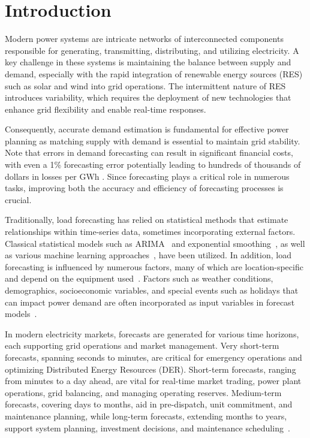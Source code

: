 \documentclass[sigconf,nonacm]{acmart}
\begin{document}

\maketitle

\section{Introduction}

Modern power systems are intricate networks of interconnected components responsible for generating, transmitting, distributing, and utilizing electricity. A key challenge in these systems is maintaining the balance between supply and demand, especially with the rapid integration of renewable energy sources (RES) such as solar and wind into grid operations. The intermittent nature of RES introduces variability, which requires the deployment of new technologies that enhance grid flexibility and enable real-time responses.

Consequently, accurate demand estimation is fundamental for effective power planning as matching supply with demand is essential to maintain grid stability. Note that errors in demand forecasting can result in significant financial costs, with even a 1\% forecasting error potentially leading to hundreds of thousands of dollars in losses per GWh \cite{Mansoor2024}. Since forecasting plays a critical role in numerous tasks, improving both the accuracy and efficiency of forecasting processes is crucial.

Traditionally, load forecasting has relied on statistical methods that estimate relationships within time-series data, sometimes incorporating external factors. Classical statistical models such as ARIMA~\cite{Chodakowska2021} and exponential smoothing~\cite{Lima2019,Taylor2009}, as well as various machine learning approaches~\cite{Bunnoon2010}, have been utilized. In addition, load forecasting is influenced by numerous factors, many of which are location-specific and depend on the equipment used~\cite{Mamun2020}. Factors such as weather conditions, demographics, socioeconomic variables, and special events such as holidays that can impact power demand are often incorporated as input variables in forecast models~\cite{Ahmed2020}.

In modern electricity markets, forecasts are generated for various time horizons, each supporting grid operations and market management. Very short-term forecasts, spanning seconds to minutes, are critical for emergency operations and optimizing Distributed Energy Resources (DER). Short-term forecasts, ranging from minutes to a day ahead, are vital for real-time market trading, power plant operations, grid balancing, and managing operating reserves. Medium-term forecasts, covering days to months, aid in pre-dispatch, unit commitment, and maintenance planning, while long-term forecasts, extending months to years, support system planning, investment decisions, and maintenance scheduling~\cite{Pinson2013, Zavadil2013, Dannecker2015}.
\end{document}
